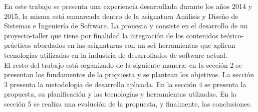 En este trabajo se presenta una experiencia desarrollada durante los años 2014 y 2015, la misma está enmarcada dentro de la asignatura Análisis y Diseño de Sistemas e Ingeniería de Software. La prouesta
y consiste en el desarrollo de un proyecto-taller que tiene por finalidad la integración de los contenidos teórico-prácticos abordados en las asignaturas con 
un set herramientas que aplican  tecnologías utilizadas en la industria de desarrollados de software actual. \\
El resto del trabajo está organizado de la siguiente manera: en la sección 2 se presentan los fundamentos de la propuesta y se plantean los 
objetivos. La sección 3 presenta la metodología de desarrollo aplicada. En la sección 4 se presenta la propuesta, su planificación y 
las tecnologías y herramientas utlizadas. En la sección 5 se realiza una evalución de la propuesta, y finalmente, las conclusiones.